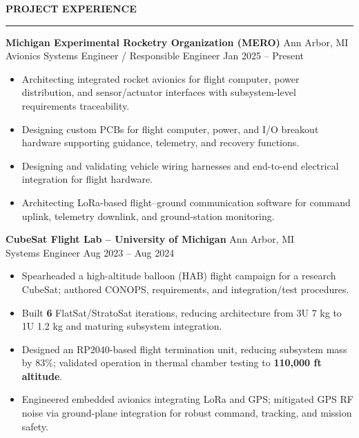 \documentclass[10pt]{article}
\newcommand{\ressection}[1]{
  \vspace{0.12em}
  {\large\bfseries #1}\par
  \vspace{0.05em}\hrule\vspace{0.12em}
}
\begin{document}
\ressection{PROJECT EXPERIENCE}

{\bfseries Michigan Experimental Rocketry Organization (MERO)} \hfill Ann Arbor, MI \\
Avionics Systems Engineer / Responsible Engineer \hfill Jan 2025 -- Present
\begin{itemize}
\item Architecting integrated rocket avionics for flight computer, power distribution, and sensor/actuator interfaces with subsystem-level requirements traceability.
\item Designing custom PCBs for flight computer, power, and I/O breakout hardware supporting guidance, telemetry, and recovery functions.
\item Designing and validating vehicle wiring harnesses and end-to-end electrical integration for flight hardware.
\item Architecting LoRa-based flight--ground communication software for command uplink, telemetry downlink, and ground-station monitoring.
\end{itemize}

{\bfseries CubeSat Flight Lab -- University of Michigan} \hfill Ann Arbor, MI \\
Systems Engineer \hfill Aug 2023 -- Aug 2024
\begin{itemize}
  \item Spearheaded a high-altitude balloon (HAB) flight campaign for a research CubeSat; authored CONOPS, requirements, and integration/test procedures.
  \item Built {\bfseries 6} FlatSat/StratoSat iterations, reducing architecture from 3U 7 kg to 1U 1.2 kg and maturing subsystem integration.
  \item Designed an RP2040-based flight termination unit, reducing subsystem mass by 83\%; validated operation in thermal chamber testing to {\bfseries 110,000 ft altitude}.
  \item Engineered embedded avionics integrating LoRa and GPS; mitigated GPS RF noise via ground-plane integration for robust command, tracking, and mission safety.
\end{itemize}
\end{document}
